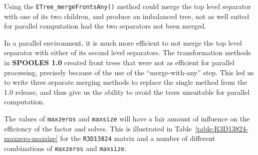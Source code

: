 Using the {\tt ETree\_mergeFrontsAny()} method could merge the top
level separator with one of its two children, and produce an
imbalanced tree, not as well suited for parallel computation had
the two separators not been merged.
\par
In a parallel environment, it is much more efficient to not merge 
the top level separator with either of its second level separators.
The transformation methods in {\bf SPOOLES 1.0} created front trees that
were not as efficient for parallel processing, precisely because of
the use of the ``merge-with-any'' step.
This led us to write three separate merging methods to replace the
single method from the 1.0 release, and thus give us the ability to
avoid the trees unsuitable for parallel computation.
\par
The values of {\tt maxzeros} and {\tt maxsize} will have a fair
amount of influence on the efficiency of the factor and solves.
This is illustrated in Table~\ref{table:R3D13824-maxzero-maxsize}
for the {\tt R3D13824} matrix and a number of different combinations 
of {\tt maxzeros} and {\tt maxsize}.
\par
